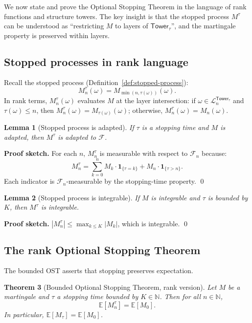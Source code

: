 \documentclass[11pt]{article}
\newtheorem{theorem}{Theorem}[section]
\newtheorem{lemma}[theorem]{Lemma}
\theoremstyle{definition}
\theoremstyle{remark}
\newcommand{\layer}{\mathcal{L}}
\newcommand{\Tower}{\mathsf{Tower}}
\newcommand{\Filtration}{\mathcal{F}}
\newcommand{\NN}{\mathbb{N}}
\newcommand{\EE}{\mathbb{E}}
\begin{document}
We now state and prove the Optional Stopping Theorem in the language of rank functions and structure towers.
The key insight is that the stopped process $M^\tau$ can be understood as ``restricting $M$ to layers of $\Tower_\tau$'', and the martingale property is preserved within layers.

\subsection{Stopped processes in rank language}

Recall the stopped process (Definition~\ref{def:stopped-process}):
\[
M^\tau_n(\omega) = M_{\min(n, \tau(\omega))}(\omega).
\]
In rank terms, $M^\tau_n(\omega)$ evaluates $M$ at the layer intersection: if $\omega \in \layer_n^{\Tower_\tau}$ and $\tau(\omega) \leq n$, then $M^\tau_n(\omega) = M_{\tau(\omega)}(\omega)$; otherwise, $M^\tau_n(\omega) = M_n(\omega)$.

\begin{lemma}[Stopped process is adapted]
\label{lem:stopped-adapted}
If $\tau$ is a stopping time and $M$ is adapted, then $M^\tau$ is adapted to $\Filtration$.
\end{lemma}

\noindent\textbf{Proof sketch.}
For each $n$, $M^\tau_n$ is measurable with respect to $\Filtration_n$ because:
\[
M^\tau_n = \sum_{k=0}^n M_k \cdot \mathbf{1}_{\{\tau = k\}} + M_n \cdot \mathbf{1}_{\{\tau > n\}}.
\]
Each indicator is $\Filtration_n$-measurable by the stopping-time property.
\qed

\begin{lemma}[Stopped process is integrable]
\label{lem:stopped-integrable}
If $M$ is integrable and $\tau$ is bounded by $K$, then $M^\tau$ is integrable.
\end{lemma}

\noindent\textbf{Proof sketch.}
$|M^\tau_n| \leq \max_{k \leq K} |M_k|$, which is integrable.
\qed

\subsection{The rank Optional Stopping Theorem}

The bounded OST asserts that stopping preserves expectation.

\begin{theorem}[Bounded Optional Stopping Theorem, rank version]
\label{thm:rank-ost-bounded}
Let $M$ be a martingale and $\tau$ a stopping time bounded by $K \in \NN$.
Then for all $n \in \NN$,
\[
\EE[M^\tau_n] = \EE[M_0].
\]
In particular, $\EE[M_{\tau}] = \EE[M_0]$.
\end{theorem}
\end{document}
